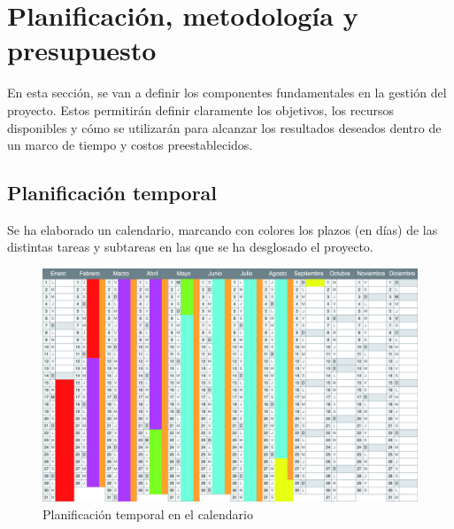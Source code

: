 \section{Planificación, metodología y presupuesto}

En esta sección, se van a definir los componentes fundamentales en la gestión del proyecto. Estos permitirán definir claramente los objetivos, los recursos disponibles y cómo se utilizarán para alcanzar los resultados deseados dentro de un marco de tiempo y costos preestablecidos.

\subsection{Planificación temporal}

Se ha elaborado un calendario, marcando con colores los plazos (en días) de las distintas tareas y subtareas en las que se ha desglosado el proyecto.

\begin{figure}[H]
	\centering
	\includegraphics[width=1\textwidth]{imgs/tabla-planning1.jpg}
	\caption{Planificación temporal en el calendario}
	\label{fig:planning1}
\end{figure}

